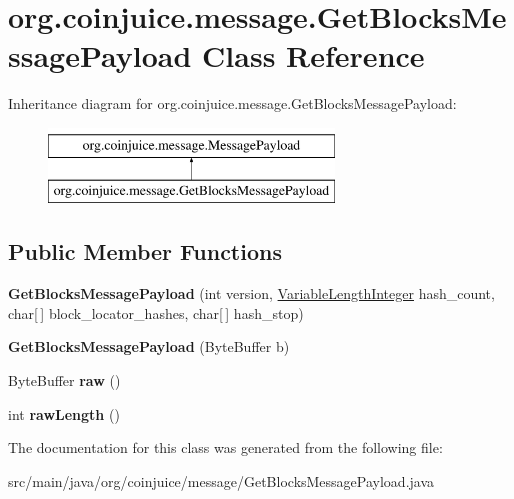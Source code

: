 \hypertarget{classorg_1_1coinjuice_1_1message_1_1_get_blocks_message_payload}{\section{org.\-coinjuice.\-message.\-Get\-Blocks\-Message\-Payload Class Reference}
\label{classorg_1_1coinjuice_1_1message_1_1_get_blocks_message_payload}
}
Inheritance diagram for org.\-coinjuice.\-message.\-Get\-Blocks\-Message\-Payload\-:\begin{figure}[H]
\begin{center}
\leavevmode
\includegraphics[height=2.000000cm]{classorg_1_1coinjuice_1_1message_1_1_get_blocks_message_payload}
\end{center}
\end{figure}
\subsection*{Public Member Functions}
\begin{DoxyCompactItemize}
\item 
\hypertarget{classorg_1_1coinjuice_1_1message_1_1_get_blocks_message_payload_af8814b5c2d3d46e332d0dee6b7d7088a}{{\bfseries Get\-Blocks\-Message\-Payload} (int version, \hyperlink{classorg_1_1coinjuice_1_1message_1_1field_1_1_variable_length_integer}{Variable\-Length\-Integer} hash\-\_\-count, char\mbox{[}$\,$\mbox{]} block\-\_\-locator\-\_\-hashes, char\mbox{[}$\,$\mbox{]} hash\-\_\-stop)}\label{classorg_1_1coinjuice_1_1message_1_1_get_blocks_message_payload_af8814b5c2d3d46e332d0dee6b7d7088a}

\item 
\hypertarget{classorg_1_1coinjuice_1_1message_1_1_get_blocks_message_payload_a544bf0eb9f3135158b0dc85d0ecc7608}{{\bfseries Get\-Blocks\-Message\-Payload} (Byte\-Buffer b)}\label{classorg_1_1coinjuice_1_1message_1_1_get_blocks_message_payload_a544bf0eb9f3135158b0dc85d0ecc7608}

\item 
\hypertarget{classorg_1_1coinjuice_1_1message_1_1_get_blocks_message_payload_a5b8c843bb59ce43252fcebd0e074181f}{Byte\-Buffer {\bfseries raw} ()}\label{classorg_1_1coinjuice_1_1message_1_1_get_blocks_message_payload_a5b8c843bb59ce43252fcebd0e074181f}

\item 
\hypertarget{classorg_1_1coinjuice_1_1message_1_1_get_blocks_message_payload_a8a7e6381f48ffe4265a1a9a32442f65c}{int {\bfseries raw\-Length} ()}\label{classorg_1_1coinjuice_1_1message_1_1_get_blocks_message_payload_a8a7e6381f48ffe4265a1a9a32442f65c}

\end{DoxyCompactItemize}


The documentation for this class was generated from the following file\-:\begin{DoxyCompactItemize}
\item 
src/main/java/org/coinjuice/message/Get\-Blocks\-Message\-Payload.\-java\end{DoxyCompactItemize}
